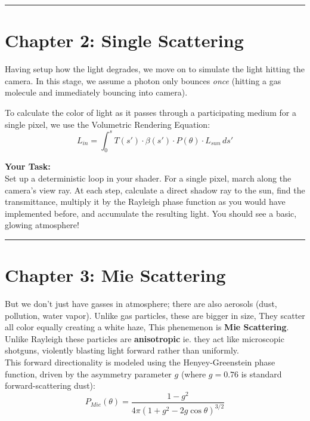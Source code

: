 \documentclass[12pt]{article}
\begin{document}
\vspace{0.5cm}\hrule\vspace{0.5cm}

\section*{Chapter 2: Single Scattering}
Having setup how the light degrades, we move on to simulate the light hitting the camera. In this stage, we assume a photon only bounces \textit{once} (hitting a gas molecule and immediately bouncing into camera).

To calculate the color of light as it passes through a participating medium for a  single pixel, we use the Volumetric Rendering Equation:
\begin{equation}
    L_{in} = \int_{0}^{s} T(s') \cdot \beta(s') \cdot P(\theta) \cdot L_{sun} \, ds'
\end{equation}

\vspace{0.2cm}\noindent\textbf{Your Task:}\\
 Set up a deterministic loop in your shader. For a single pixel, march along the camera's view ray. At each step, calculate a direct shadow ray to the sun, find the transmittance, multiply it by the Rayleigh phase function as you would have implemented before, and accumulate the resulting light. You should see a basic, glowing  atmosphere!

\vspace{0.5cm}\hrule\vspace{0.5cm}

\section*{Chapter 3: Mie Scattering}

But we don't just have gasses in atmosphere; there are also aerosols (dust, pollution, water vapor). Unlike gas particles, these are bigger in size, They scatter all color equally creating a white haze, This phenemenon is  \textbf{Mie Scattering}. Unlike Rayleigh these particles are \textbf{anisotropic} ie. they act like microscopic shotguns, violently blasting light forward rather than uniformly.
\vspace{0.2cm}\noindent\textbf{}\\
This forward directionality is modeled using the Henyey-Greenstein phase function, driven by the asymmetry parameter $g$ (where $g=0.76$ is standard forward-scattering dust):
\begin{equation}
    P_{Mie}(\theta) = \frac{1 - g^2}{4\pi (1 + g^2 - 2g \cos\theta)^{3/2}}
\end{equation}
\end{document}
